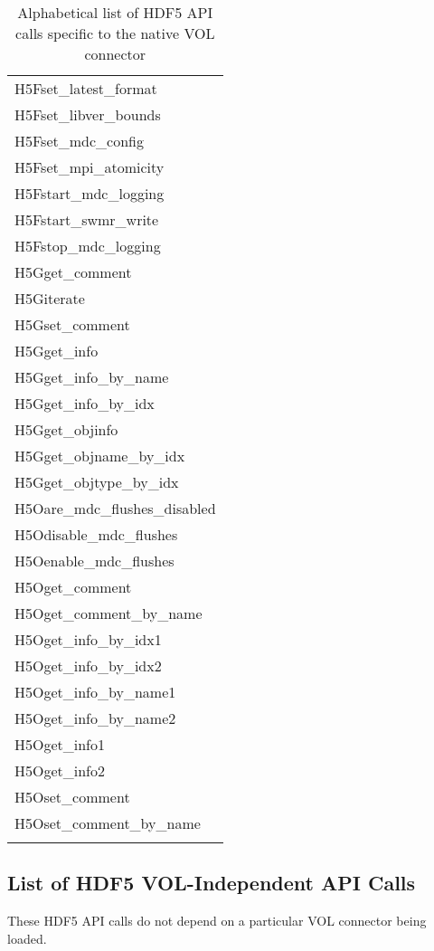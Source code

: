 \begin{longtable}{ |>{\raggedright\arraybackslash}p{\linewidth}| }
    H5Fset\_latest\_format \\
    H5Fset\_libver\_bounds \\
    H5Fset\_mdc\_config \\
    H5Fset\_mpi\_atomicity \\
    H5Fstart\_mdc\_logging \\
    H5Fstart\_swmr\_write \\
    H5Fstop\_mdc\_logging \\
    \hline
    H5Gget\_comment \\
    H5Giterate \\
    H5Gset\_comment \\
    H5Gget\_info \\
    H5Gget\_info\_by\_name \\
    H5Gget\_info\_by\_idx \\
    H5Gget\_objinfo \\
    H5Gget\_objname\_by\_idx \\
    H5Gget\_objtype\_by\_idx \\
    \hline
    H5Oare\_mdc\_flushes\_disabled \\
    H5Odisable\_mdc\_flushes \\
    H5Oenable\_mdc\_flushes \\
    H5Oget\_comment \\
    H5Oget\_comment\_by\_name \\
    H5Oget\_info\_by\_idx1 \\
    H5Oget\_info\_by\_idx2 \\
    H5Oget\_info\_by\_name1 \\
    H5Oget\_info\_by\_name2 \\
    H5Oget\_info1 \\
    H5Oget\_info2 \\
    H5Oset\_comment \\
    H5Oset\_comment\_by\_name \\
    \hline
\caption{Alphabetical list of HDF5 API calls specific to the native VOL connector}
\end{longtable}

\subsection{List of HDF5 VOL-Independent API Calls}

These HDF5 API calls do not depend on a particular VOL connector being loaded.

